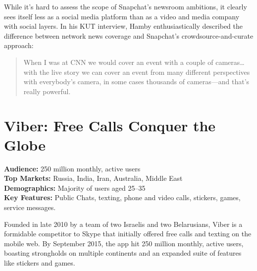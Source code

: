 \documentclass[notoc, symmetric, nobib, nols]{towcenter-guideto-book}
\begin{document}



While it's hard to assess the scope of Snapchat's newsroom ambitions, it clearly sees itself less as a social media platform than as a video and media company with social layers. In his KUT interview, Hamby enthusiastically described the difference between network news coverage and Snapchat's crowdsource-and-curate approach:   

\begin{quote}
When I was at CNN we would cover an event with a couple of cameras\ldots with the live story we can cover an event from many different perspectives with everybody's camera, in some cases thousands of cameras---and that's really powerful.\autocite{KUTSnapchatElection}
\end{quote}

\section{Viber: Free Calls Conquer the Globe}

\begin{framed}
\noindent\textbf{Audience:} 250 million monthly, active users \\
\noindent\textbf{Top Markets:} Russia, India, Iran, Australia, Middle East\\
\noindent\textbf{Demographics:} Majority of users aged 25--35 \\
\noindent\textbf{Key Features:} Public Chats, texting, phone and video calls, stickers, games, service messages.
\end{framed}
\vspace{\baselineskip}
Founded in late 2010 by a team of two Israelis and two Belarusians, Viber is a formidable competitor to Skype that initially offered free calls and texting on the mobile web. By September 2015, the app hit 250 million monthly, active users, boasting strongholds on multiple continents and an expanded suite of features like stickers and games.  
\end{document}
